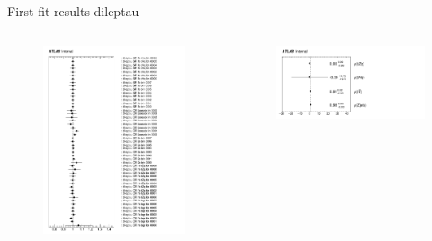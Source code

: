 \begin{frame}{First fit results dileptau}
    \begin{columns}
        \begin{column}{0.5\textwidth}
            \begin{figure}
                \centering
                \includegraphics[width=\textwidth]{asimov}
            \end{figure}
        \end{column}
        \begin{column}{0.5\textwidth}
            \begin{figure}
                \centering
                \includegraphics[width=\textwidth]{fit}

\end{figure}
\end{column}
\end{columns}
\end{frame}
